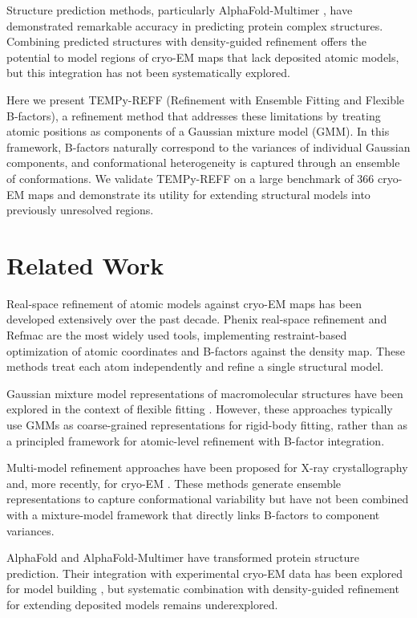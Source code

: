 \documentclass[11pt]{article}
\begin{document}
Structure prediction methods, particularly AlphaFold-Multimer \citep{evans2022}, have demonstrated remarkable accuracy in predicting protein complex structures. Combining predicted structures with density-guided refinement offers the potential to model regions of cryo-EM maps that lack deposited atomic models, but this integration has not been systematically explored.

Here we present TEMPy-REFF (Refinement with Ensemble Fitting and Flexible B-factors), a refinement method that addresses these limitations by treating atomic positions as components of a Gaussian mixture model (GMM). In this framework, B-factors naturally correspond to the variances of individual Gaussian components, and conformational heterogeneity is captured through an ensemble of conformations. We validate TEMPy-REFF on a large benchmark of 366 cryo-EM maps and demonstrate its utility for extending structural models into previously unresolved regions.

\section{Related Work}

Real-space refinement of atomic models against cryo-EM maps has been developed extensively over the past decade. Phenix real-space refinement \citep{afonine2018} and Refmac \citep{murshudov2011} are the most widely used tools, implementing restraint-based optimization of atomic coordinates and B-factors against the density map. These methods treat each atom independently and refine a single structural model.

Gaussian mixture model representations of macromolecular structures have been explored in the context of flexible fitting \citep{kawabata2008,tama2004}. However, these approaches typically use GMMs as coarse-grained representations for rigid-body fitting, rather than as a principled framework for atomic-level refinement with B-factor integration.

Multi-model refinement approaches have been proposed for X-ray crystallography \citep{burnley2012} and, more recently, for cryo-EM \citep{berndsen2023}. These methods generate ensemble representations to capture conformational variability but have not been combined with a mixture-model framework that directly links B-factors to component variances.

AlphaFold \citep{jumper2021} and AlphaFold-Multimer \citep{evans2022} have transformed protein structure prediction. Their integration with experimental cryo-EM data has been explored for model building \citep{mirdita2022}, but systematic combination with density-guided refinement for extending deposited models remains underexplored.
\end{document}
